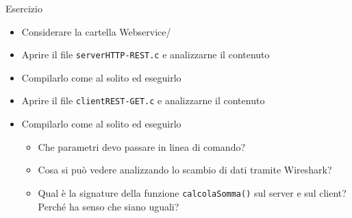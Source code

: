 \documentclass[11pt]{article}
\begin{document}
\begin{tcolorbox}[colback=blue!5!white,colframe=blue!75!black,title=\textbf{DOMANDA}, breakable]
Esercizio
\begin{itemize}
    \item Considerare la cartella Webservice/
    \item Aprire il file \texttt{serverHTTP-REST.c} e analizzarne il contenuto
    \item Compilarlo come al solito ed eseguirlo
    \item Aprire il file \texttt{clientREST-GET.c} e analizzarne il contenuto
    \item Compilarlo come al solito ed eseguirlo
    \begin{itemize}
        \item Che parametri devo passare in linea di comando?
        \item Cosa si può vedere analizzando lo scambio di dati tramite Wireshark?
        \item Qual è la signature della funzione \texttt{calcolaSomma()} sul server e sul client? Perché ha senso che siano uguali?
    \end{itemize}
\end{itemize}
\end{tcolorbox}
\end{document}
